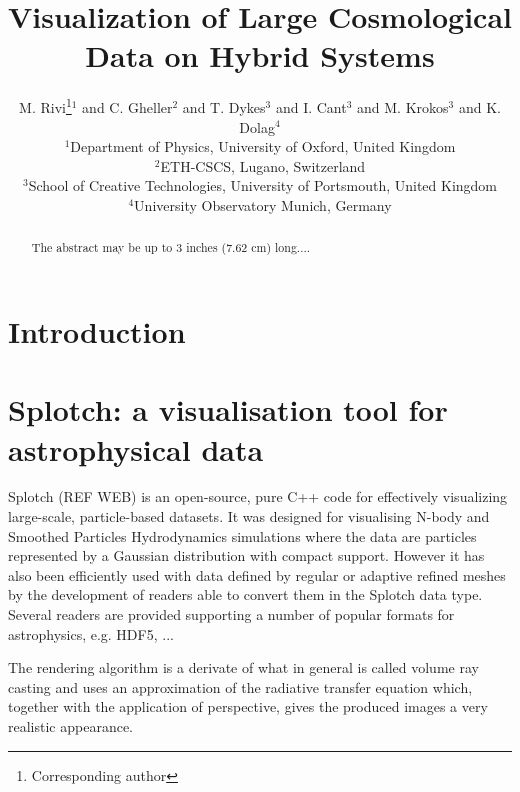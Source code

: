 \documentclass{egpubl}
\title[Visualization of Large Cosmological Data on Hybrid Systems]%
      {Visualization of Large Cosmological Data on Hybrid Systems}
\author[M. Rivi \& C. Gheller \& T. Dykes \& I. Cant \& M. Krokos \& K. Dolag]
       {M. Rivi\thanks{Corresponding author}$^{1}$
        and C. Gheller$^{2}$ and T. Dykes$^{3}$ and I. Cant$^3$ and M. Krokos$^{3}$ and K. Dolag$^{4}$
        \\
         $^1$Department of Physics, University of Oxford, United Kingdom\\
         $^2$ETH-CSCS, Lugano, Switzerland\\
         $^3$School of Creative Technologies, University of Portsmouth, United Kingdom\\
         $^4$University Observatory Munich, Germany
       }
\begin{document}

\maketitle

\begin{abstract}
   The abstract may be up to 3 inches (7.62 cm) long.... 

\begin{classification} %
\end{classification}

\end{abstract}

 
\section{Introduction}

\section{Splotch: a visualisation tool for astrophysical data}

Splotch (REF WEB) is an open-source, pure C++ code for effectively visualizing large-scale, particle-based datasets. It was designed for visualising N-body and Smoothed Particles Hydrodynamics simulations where the data are particles represented by a Gaussian distribution with compact support. However it has also been efficiently used with data defined by regular or adaptive refined meshes by the development of readers able to convert them in the Splotch data type. Several readers are provided supporting a number of popular formats for astrophysics, e.g. HDF5, ...

The rendering algorithm is a derivate of what in general is called volume ray casting and uses an approximation of the radiative transfer equation
which, together with the application of perspective, gives the produced images a very realistic appearance. 
\end{document}
